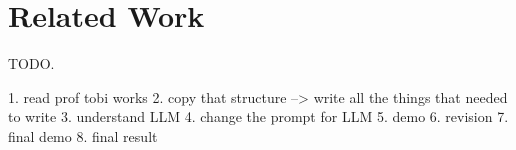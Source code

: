 \section{Related Work}

TODO.

1. read prof tobi  works
2. copy that structure --> write all the things that needed to write
3. understand LLM 
4. change the prompt for LLM
5. demo
6. revision
7. final demo
8. final result
